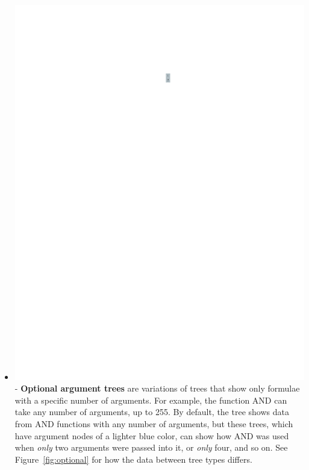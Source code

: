 \documentclass[conference]{IEEEtran}
\begin{document}
\begin{itemize}
		\item  \vspace{.25cm} \includegraphics[scale=.75]{glossary-lightblue} -
		\textbf{Optional argument trees} are variations of trees that show only
		formulae with a specific number of arguments. For example, the function AND
		can take any number of arguments, up to 255. By default, the tree shows data
		from AND functions with any number of arguments, but these trees, which have
		argument nodes of a lighter blue color, can show how AND was used when
		\textit{only} two arguments were passed into it, or \textit{only} four, and so
		on. See Figure~\ref{fig:optional} for how the data between tree types differs.
	\end{itemize}
	
\end{document}
